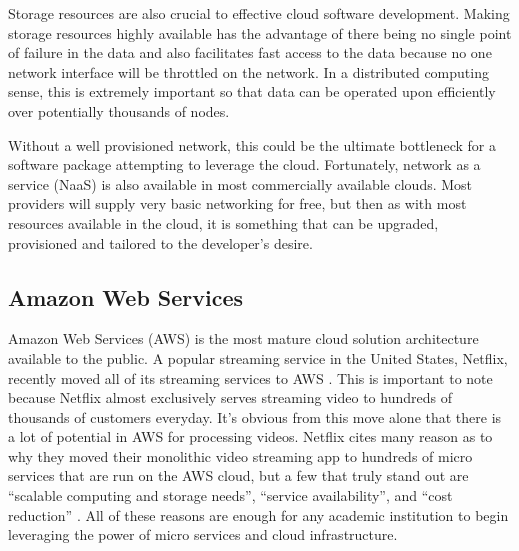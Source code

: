Storage resources are also crucial to effective cloud software development.
Making storage resources highly available has the advantage of there being
no single point of failure in the data and also facilitates fast access to the
data because no one network interface will be throttled on the network. In a
distributed computing sense, this is extremely important so that data can be operated
upon efficiently over potentially thousands of nodes.

Without a well provisioned network, this could be the ultimate bottleneck for
a software package attempting to leverage the cloud. Fortunately, network as a
service (NaaS) is also available in most commercially available clouds. Most
providers will supply very basic networking for free, but then as with most
resources available in the cloud, it is something that can be upgraded, provisioned
and tailored to the developer's desire.

\subsection{\label{subsection:aws}Amazon Web Services}
Amazon Web Services (AWS) is the most mature cloud solution architecture
available to the public. A popular streaming service in the United States,
Netflix, recently moved all of its streaming services to AWS
\cite{netflixawsmove}. This is important to note because Netflix almost
exclusively serves streaming video to hundreds of thousands of customers
everyday. It's obvious from this move alone that there is a lot of potential in
AWS for processing videos. Netflix cites many reason as to why they moved their
monolithic video streaming app to hundreds of micro services that are run on the
AWS cloud, but a few that truly stand out are \enquote{scalable computing and
storage needs}, \enquote{service availability}, and \enquote{cost reduction}
\cite{netflixawsmove}. All of these reasons are enough for any academic
institution to begin leveraging the power of micro services and cloud
infrastructure.

